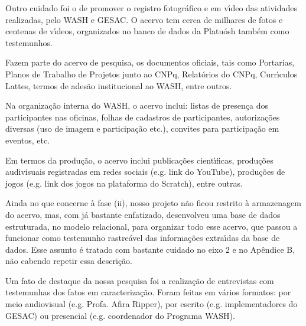 \documentclass[
12pt,		%
openright,	%
twoside,  %
a4paper,			%
chapter=TITLE,		%
english,			%
french,				%
spanish,			%
brazil				%
]{USPSC-classe/USPSC}
\begin{document}
Outro cuidado foi o de promover o registro fotogr\'afico e em v\'{\i}deo das atividades realizadas, pelo WASH e GESAC. O acervo tem cerca de milhares de fotos e centenas de v\'{\i}deos, organizados no banco de dados da Platu\'osh tamb\'em como testemunhos.








Fazem parte do acervo de pesquisa, os documentos oficiais, tais como Portarias, Planos de Trabalho de Projetos junto ao CNPq, Relat\'orios do CNPq, Curr\'{\i}culos Lattes, termos de ades\~ao institucional ao WASH, entre outros.








Na organiza\c{c}\~ao interna do WASH, o acervo inclui: listas de presen\c{c}a dos participantes nas oficinas, folhas de cadastros de participantes, autoriza\c{c}\~oes diversas (uso de imagem e participa\c{c}\~ao etc.), convites   para participa\c{c}\~ao em eventos, etc.








Em termos da produ\c{c}\~ao, o acervo inclui publica\c{c}\~oes cient\'{\i}ficas, produ\c{c}\~oes audivisuais registradas em redes sociais (e.g. link do YouTube), produ\c{c}\~oes de jogos (e.g. link dos jogos na plataforma do Scratch), entre outras.








Ainda no que concerne \`a fase (ii), nosso projeto n\~ao ficou restrito \`a armazenagem do acervo, mas, com j\'a bastante enfatizado, desenvolveu uma base de dados estruturada, no modelo relacional, para organizar todo esse acervo, que passou a funcionar como testemunho rastre\'avel das informa\c{c}\~oes extra\'{\i}das da base de dados. Esse assunto \'e tratado com bastante cuidado no eixo 2 e no Ap\^endice B, n\~ao cabendo repetir essa descri\c{c}\~ao.








Um fato de destaque da nossa pesquisa foi a realiza\c{c}\~ao de entrevistas com testemunhas dos fatos em caracteriza\c{c}\~ao. Foram feitas em v\'arios formatos: por meio audiovisual (e.g. Profa. Afira Ripper), por escrito (e.g. implementadores do GESAC) ou presencial (e.g. coordenador do Programa WASH).
\end{document}
